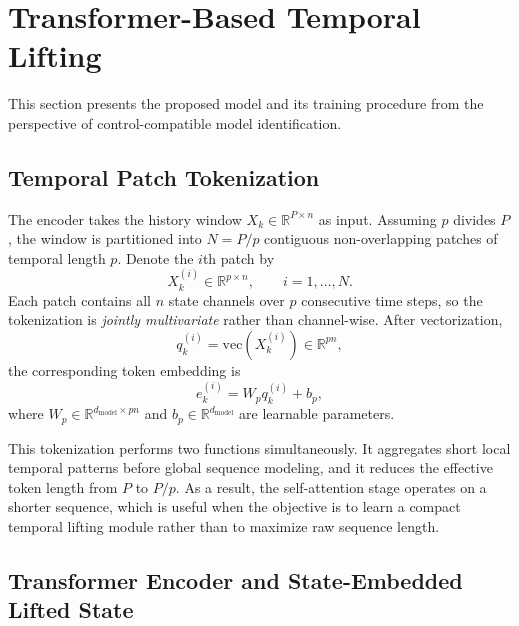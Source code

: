 \documentclass[journal]{IEEEtran}
\begin{document}
\section{Transformer-Based Temporal Lifting}
\label{sec:methodology}

This section presents the proposed model and its training procedure from the perspective of control-compatible model identification.

\subsection{Temporal Patch Tokenization}

The encoder takes the history window $X_k \in \mathbb{R}^{P\times n}$ as input. Assuming $p$ divides $P$, the window is partitioned into $N=P/p$ contiguous non-overlapping patches of temporal length $p$. Denote the $i$th patch by
\begin{equation}
    X_k^{(i)} \in \mathbb{R}^{p\times n}, \qquad i=1,\ldots,N.
\end{equation}
Each patch contains all $n$ state channels over $p$ consecutive time steps, so the tokenization is \emph{jointly multivariate} rather than channel-wise. After vectorization,
\begin{equation}
    q_k^{(i)} = \mathrm{vec}(X_k^{(i)}) \in \mathbb{R}^{pn},
\end{equation}
the corresponding token embedding is
\begin{equation}
    e_k^{(i)} = W_p q_k^{(i)} + b_p,
    \label{eq:patch_embedding}
\end{equation}
where $W_p \in \mathbb{R}^{d_{\mathrm{model}}\times pn}$ and $b_p \in \mathbb{R}^{d_{\mathrm{model}}}$ are learnable parameters.

This tokenization performs two functions simultaneously. It aggregates short local temporal patterns before global sequence modeling, and it reduces the effective token length from $P$ to $P/p$. As a result, the self-attention stage operates on a shorter sequence, which is useful when the objective is to learn a compact temporal lifting module rather than to maximize raw sequence length.

\subsection{Transformer Encoder and State-Embedded Lifted State}
\end{document}
